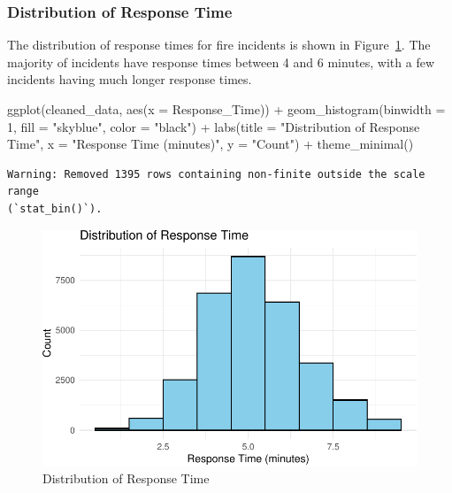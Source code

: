 \documentclass[
  letterpaper,
  DIV=11,
  numbers=noendperiod]{scrartcl}
\newenvironment{Shaded}{\begin{snugshade}}{\end{snugshade}}
\newcommand{\AttributeTok}[1]{\textcolor[rgb]{0.40,0.45,0.13}{#1}}
\newcommand{\DecValTok}[1]{\textcolor[rgb]{0.68,0.00,0.00}{#1}}
\newcommand{\FunctionTok}[1]{\textcolor[rgb]{0.28,0.35,0.67}{#1}}
\newcommand{\NormalTok}[1]{\textcolor[rgb]{0.00,0.23,0.31}{#1}}
\newcommand{\SpecialCharTok}[1]{\textcolor[rgb]{0.37,0.37,0.37}{#1}}
\newcommand{\StringTok}[1]{\textcolor[rgb]{0.13,0.47,0.30}{#1}}
\begin{document}
\hypertarget{distribution-of-response-time}{%
\subsubsection{Distribution of Response
Time}\label{distribution-of-response-time}}

The distribution of response times for fire incidents is shown in
Figure~\ref{fig-response-time}. The majority of incidents have response
times between 4 and 6 minutes, with a few incidents having much longer
response times.

\begin{Shaded}
\begin{Highlighting}[]
\FunctionTok{ggplot}\NormalTok{(cleaned\_data, }\FunctionTok{aes}\NormalTok{(}\AttributeTok{x =}\NormalTok{ Response\_Time)) }\SpecialCharTok{+}
  \FunctionTok{geom\_histogram}\NormalTok{(}\AttributeTok{binwidth =} \DecValTok{1}\NormalTok{, }\AttributeTok{fill =} \StringTok{"skyblue"}\NormalTok{, }\AttributeTok{color =} \StringTok{"black"}\NormalTok{) }\SpecialCharTok{+}
  \FunctionTok{labs}\NormalTok{(}\AttributeTok{title =} \StringTok{"Distribution of Response Time"}\NormalTok{, }\AttributeTok{x =} \StringTok{"Response Time (minutes)"}\NormalTok{, }\AttributeTok{y =} \StringTok{"Count"}\NormalTok{) }\SpecialCharTok{+}
  \FunctionTok{theme\_minimal}\NormalTok{()}
\end{Highlighting}
\end{Shaded}

\begin{verbatim}
Warning: Removed 1395 rows containing non-finite outside the scale range
(`stat_bin()`).
\end{verbatim}

\begin{figure}[H]

{\centering \includegraphics{paper_files/figure-pdf/fig-response-time-1.pdf}

}

\caption{\label{fig-response-time}Distribution of Response Time}

\end{figure}
\end{document}
